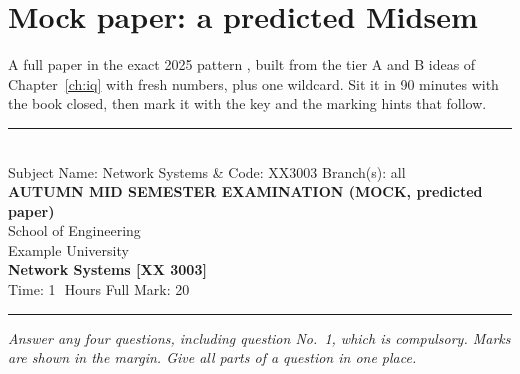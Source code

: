 \chapter{Mock paper: a predicted Midsem}
\label{ch:mock}
A full paper in the exact 2025 pattern , built from the tier A and B ideas of Chapter~\ref{ch:iq} with fresh numbers, plus one wildcard. Sit it in 90 minutes with the book closed, then mark it with the key and the marking hints that follow.

\begin{center}
\rule{\linewidth}{0.6pt}\\[2pt]
{\small Subject Name: Network Systems \& Code: XX3003 \hfill Branch(s): all}\\[4pt]
{\large\bfseries AUTUMN MID SEMESTER EXAMINATION (MOCK, predicted paper)}\\[2pt]
School of Engineering\\
Example University\\[2pt]
{\bfseries Network Systems [XX 3003]}\\[4pt]
{\small Time: 1\,\textonehalf\ Hours \hfill Full Mark: 20}\\
\rule{\linewidth}{0.6pt}
\end{center}
{\small\itshape Answer any four questions, including question No.~1, which is compulsory. Marks are shown in the margin. Give all parts of a question in one place.}

